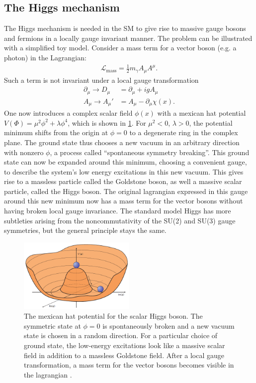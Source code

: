 \documentclass[twoside,        %
               BCOR12mm,       %
               ngerman,english, %
               fleqn,headsepline=false,footsepline=false
              ]{Vorlage/MFPREPORT}
\begin{document}
\subsection{The Higgs mechanism}
\cite[Ch. 17]{thomson}
The Higgs mechanism is needed in the SM to give rise to massive gauge bosons
and fermions in a locally gauge invariant manner.
The problem can be illustrated with a simplified toy model. Consider a mass
term for a vector boson (e.g. a photon) in the Lagrangian:
\begin{align}
    \mathcal{L}_\text{mass}=\frac{1}{2}m_\gamma A_\mu A^\mu.
    \label{eq:massterm}
\end{align}
Such a term is not invariant under a local gauge transformation
\begin{align}
    \partial_\mu\rightarrow D_\mu&=\partial_\mu+i g A_\mu\\
    A_\mu\rightarrow A_\mu'&=A_\mu-\partial_\mu \chi(x).
    \label{eq:gauge}
\end{align}
One now introduces a complex scalar field $\phi(x)$ with a mexican hat
potential $V(\Phi)=\mu^2\phi^2+\lambda\phi^4$, which is shown in
\cref{fig:mexhat}. For $\mu^2<0$, $\lambda>0$, the potential minimum shifts
from the origin at $\phi=0$ to a degenerate ring in the complex plane. The
ground state thus chooses a new vacuum in an arbitrary direction with nonzero
$\phi$, a process called ``spontaneous symmetry breaking''. This ground state
can now be expanded around this minimum, choosing a convenient gauge, to
describe the system's low energy excitations in this new vacuum. This gives
rise to a massless particle called the Goldstone boson, as well a massive scalar
particle, called the Higgs boson. The original lagrangian expressed in this
gauge around this new minimum now has a mass term for the vector bosons without
having broken local gauge invariance.
The standard model Higgs has more subtleties arising from the noncommutativity
of the SU(2) and SU(3) gauge symmetries, but the general principle stays the
same.


\begin{figure}[]
    \centering
    \includegraphics[width=0.5\textwidth]{fig/higgspotential}
    \caption{The mexican hat potential for the scalar Higgs boson. The
    symmetric state at $\phi=0$ is spontaneously broken and a new vacuum state
is chosen in a random direction. For a particular choice of ground state, the
low-energy excitations look like a massive scalar field in addition to a
massless Goldstone field. After a local gauge transformation, a mass term
for the vector bosons becomes visible in the lagrangian \cite{mexhat}.}
    \label{fig:mexhat}
\end{figure}
\end{document}
